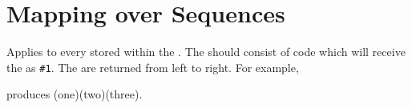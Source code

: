 \documentclass[oneside]{book}
\begin{document}
\section{Mapping over Sequences}



\begin{function}{\SeqVarMapInline}
\begin{syntax}
  
\end{syntax}
Applies  to every  stored
within the . The  should
consist of code which will receive the  as \verb|#1|.
The  are returned from left to right. For example,
\begin{codehigh}
\IgnoreSpacesOn
\SeqSetFromClist {}
\TlClear \lTmpaTl
\SeqVarMapInline {}
\Return {\TlUse\lTmpaTl}
\IgnoreSpacesOff
\end{codehigh}
produces (one)(two)(three).
\end{function}

\end{document}
